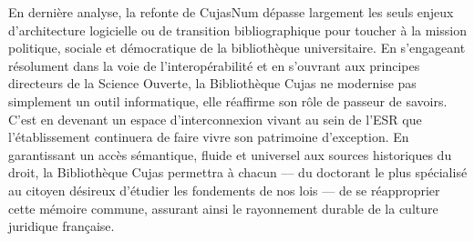 En dernière analyse, la refonte de CujasNum dépasse largement les seuls enjeux d'architecture logicielle ou de transition bibliographique pour toucher à la mission politique, sociale et démocratique de la bibliothèque universitaire. En s'engageant résolument dans la voie de l'interopérabilité et en s'ouvrant aux principes directeurs de la Science Ouverte, la Bibliothèque Cujas ne modernise pas simplement un outil informatique, elle réaffirme son rôle de passeur de savoirs. C'est en devenant un espace d'interconnexion vivant au sein de l'\ac{ESR} que l'établissement continuera de faire vivre son patrimoine d'exception. En garantissant un accès sémantique, fluide et universel aux sources historiques du droit, la Bibliothèque Cujas permettra à chacun — du doctorant le plus spécialisé au citoyen désireux d'étudier les fondements de nos lois — de se réapproprier cette mémoire commune, assurant ainsi le rayonnement durable de la culture juridique française.